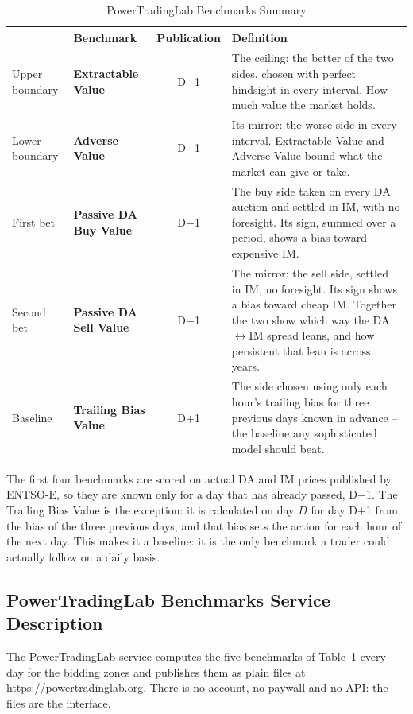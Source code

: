 \documentclass[11pt,a4paper]{article}
\begin{document}
\begin{table}[htbp]
\centering
\small
\caption{PowerTradingLab Benchmarks Summary}
\renewcommand{\arraystretch}{1.3}
\begin{tabular}{@{}p{2.0cm} l c p{6.9cm}@{}}
\toprule
& \textbf{Benchmark} & \textbf{Publication} & \textbf{Definition} \\
\midrule
Upper boundary  & \textbf{Extractable Value} & D$-$1 & The ceiling: the better of the two sides, chosen with perfect hindsight in every interval. How much value the market holds. \\
Lower boundary & \textbf{Adverse Value} & D$-$1 & Its mirror: the worse side in every interval. Extractable Value and Adverse Value bound what the market can give or take. \\
\addlinespace
First bet  & \textbf{Passive DA Buy Value} & D$-$1 & The buy side taken on every DA auction and settled in IM, with no foresight. Its sign, summed over a period, shows a bias toward expensive IM. \\
Second bet & \textbf{Passive DA Sell Value} & D$-$1 & The mirror: the sell side, settled in IM, no foresight. Its sign shows a bias toward cheap IM. Together the two show which way the DA$\leftrightarrow$IM spread leans, and how persistent that lean is across years. \\
\addlinespace
Baseline & \textbf{Trailing Bias Value} & D$+$1 & The side chosen using only each hour's trailing bias for three previous days known in advance -- the baseline any sophisticated model should beat. \\
\bottomrule
\end{tabular}
\label{tab:ptl_benchmarks}
\end{table}

The first four benchmarks are scored on actual DA and IM prices published by ENTSO-E, so they are known only for a day that has already passed, D$-$1. The Trailing Bias Value is the exception: it is calculated on day $D$ for day D$+$1 from the bias of the three previous days, and that bias sets the action for each hour of the next day. This makes it a baseline: it is the only benchmark a trader could actually follow on a daily basis.

\subsection{PowerTradingLab Benchmarks Service Description}

The PowerTradingLab service computes the five benchmarks of Table~\ref{tab:ptl_benchmarks} every day for the bidding zones and publishes them as plain files at \url{https://powertradinglab.org}. There is no account, no paywall and no API: the files are the interface.
\end{document}
